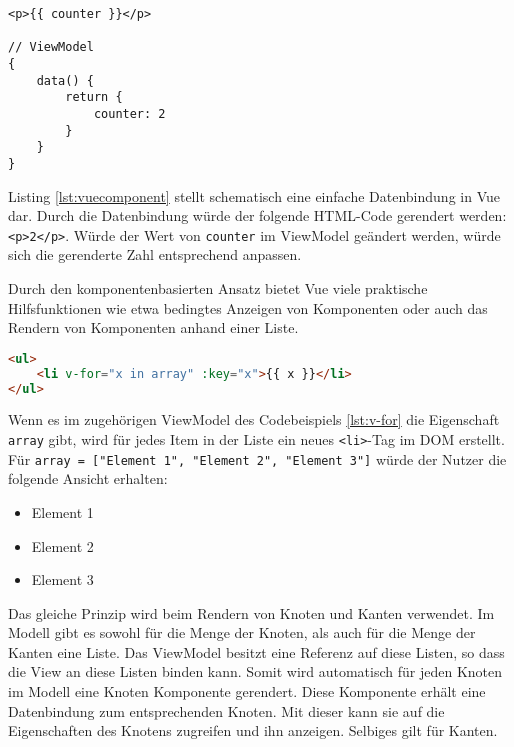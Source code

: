 \bigskip

\begin{lstlisting}[caption=Datenbindung in Vue, label=lst:vuecomponent]
<p>{{ counter }}</p>

// ViewModel
{
    data() {
        return {
            counter: 2
        }
    }
}
\end{lstlisting}

Listing \ref{lst:vuecomponent} stellt schematisch eine einfache Datenbindung in Vue dar. Durch die Datenbindung würde der folgende HTML-Code gerendert werden: \texttt{<p>2</p>}. Würde der Wert von \texttt{counter} im ViewModel geändert werden, würde sich die gerenderte Zahl entsprechend anpassen.

Durch den komponentenbasierten Ansatz bietet Vue viele praktische Hilfsfunktionen wie etwa bedingtes Anzeigen von Komponenten oder auch das Rendern von Komponenten anhand einer Liste.

\begin{lstlisting}[caption=Rendern von Listen in Vue, label=lst:v-for,language=HTML]
<ul>
    <li v-for="x in array" :key="x">{{ x }}</li>
</ul>
\end{lstlisting}

Wenn es im zugehörigen ViewModel des Codebeispiels \ref{lst:v-for} die Eigenschaft \texttt{array} gibt, wird für jedes Item in der Liste ein neues \texttt{<li>}-Tag im \ac{DOM} erstellt. Für \texttt{array = ["{}Element 1"{}, "{}Element 2"{}, "{}Element 3"{}]} würde der Nutzer die folgende Ansicht erhalten:
\begin{itemize}
    \item Element 1
    \item Element 2
    \item Element 3
\end{itemize}

Das gleiche Prinzip wird beim Rendern von Knoten und Kanten verwendet. Im Modell gibt es sowohl für die Menge der Knoten, als auch für die Menge der Kanten eine Liste. Das ViewModel besitzt eine Referenz auf diese Listen, so dass die View an diese Listen binden kann. Somit wird automatisch für jeden Knoten im Modell eine Knoten Komponente gerendert. Diese Komponente erhält eine Datenbindung zum entsprechenden Knoten. Mit dieser kann sie auf die Eigenschaften des Knotens zugreifen und ihn anzeigen. Selbiges gilt für Kanten.